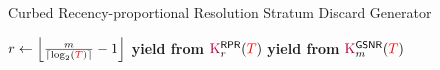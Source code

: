 \begin{algorithm}
\caption{Curbed Recency-proportional Resolution Stratum Discard Generator}
\label{alg:curbed-recency-proportional-algo-gen-drop-ranks}
\begin{algorithmic}[1]
\Ensure{ $\colorTbar \in [0 \twodots \colorT)$ -- data items to drop, if any }
\State $r \gets \left\lfloor \frac{m}{\left\lceil \log_2(\colorT) \right\rceil} - 1 \right\rfloor$
  \State \textbf{yield from} $\colorK^{\mathsf{RPR}}_r(\colorT)$
\Else
  \State \textbf{yield from} $\colorK^{\mathsf{GSNR}}_m(\colorT)$
\EndIf
\end{algorithmic}
\end{algorithm}
